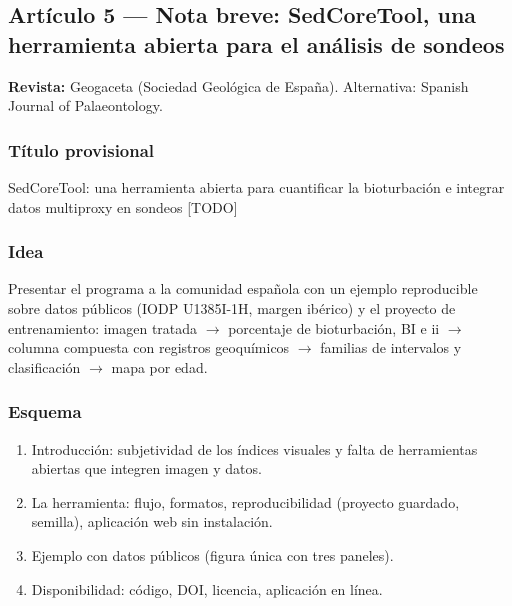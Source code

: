 \documentclass[
  10pt,
]{article}
\providecommand{\tightlist}{%
  \setlength{\itemsep}{0pt}\setlength{\parskip}{0pt}}
\begin{document}
\hypertarget{artuxedculo-5-nota-breve-sedcoretool-una-herramienta-abierta-para-el-anuxe1lisis-de-sondeos}{%
\subsection{Artículo 5 --- Nota breve: SedCoreTool, una herramienta
abierta para el análisis de
sondeos}\label{artuxedculo-5-nota-breve-sedcoretool-una-herramienta-abierta-para-el-anuxe1lisis-de-sondeos}}

\textbf{Revista:} Geogaceta (Sociedad Geológica de España). Alternativa:
Spanish Journal of Palaeontology.

\hypertarget{tuxedtulo-provisional}{%
\subsubsection{Título provisional}\label{tuxedtulo-provisional}}

SedCoreTool: una herramienta abierta para cuantificar la bioturbación e
integrar datos multiproxy en sondeos {[}TODO{]}

\hypertarget{idea-1}{%
\subsubsection{Idea}\label{idea-1}}

Presentar el programa a la comunidad española con un ejemplo
reproducible sobre datos públicos (IODP U1385I-1H, margen ibérico) y el
proyecto de entrenamiento: imagen tratada $\rightarrow$ porcentaje de bioturbación,
BI e ii $\rightarrow$ columna compuesta con registros geoquímicos $\rightarrow$ familias de
intervalos y clasificación $\rightarrow$ mapa por edad.

\hypertarget{esquema}{%
\subsubsection{Esquema}\label{esquema}}

\begin{enumerate}
\def\labelenumi{\arabic{enumi}.}
\tightlist
\item
  Introducción: subjetividad de los índices visuales y falta de
  herramientas abiertas que integren imagen y datos.
\item
  La herramienta: flujo, formatos, reproducibilidad (proyecto guardado,
  semilla), aplicación web sin instalación.
\item
  Ejemplo con datos públicos (figura única con tres paneles).
\item
  Disponibilidad: código, DOI, licencia, aplicación en línea.
\end{enumerate}
\end{document}

